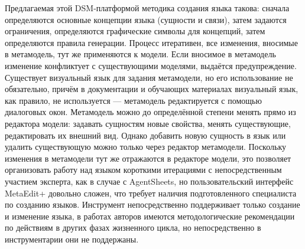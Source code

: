 Предлагаемая этой DSM-платформой методика создания языка такова: сначала определяются 
основные концепции языка (сущности и связи), затем задаются ограничения, определяются 
графические символы для концепций, затем определяются правила генерации. Процесс итеративен, 
все изменения, вносимые в метамодель, тут же применяются к модели. Если вносимое в метамодель 
изменение конфликтует с существующими моделями, выдаётся предупреждение. Существует визуальный 
язык для задания метамодели, но его использование не обязательно, причём в документации и 
обучающих материалах визуальный язык, как правило, не используется --- метамодель редактируется 
с помощью диалоговых окон. Метамодель можно до определённой степени менять прямо из редактора 
модели: задавать сущностям новые свойства, менять существующие, редактировать их внешний 
вид. Однако добавить новую сущность в язык или удалить существующую можно только через 
редактор метамодели. Поскольку изменения в метамодели тут же отражаются в редакторе модели, 
это позволяет организовать работу над языком короткими итерациями с непосредственным 
участием эксперта, как в случае с AgentSheets, но пользовательский интерфейс MetaEdit+ 
довольно сложен, что требует наличия подготовленного специалиста по созданию языков. 
Инструмент непосредственно поддерживает только создание и изменение языка, в работах авторов 
имеются методологические рекомендации по действиям в других фазах жизненного цикла, но 
непосредственно в инструментарии они не поддержаны.

